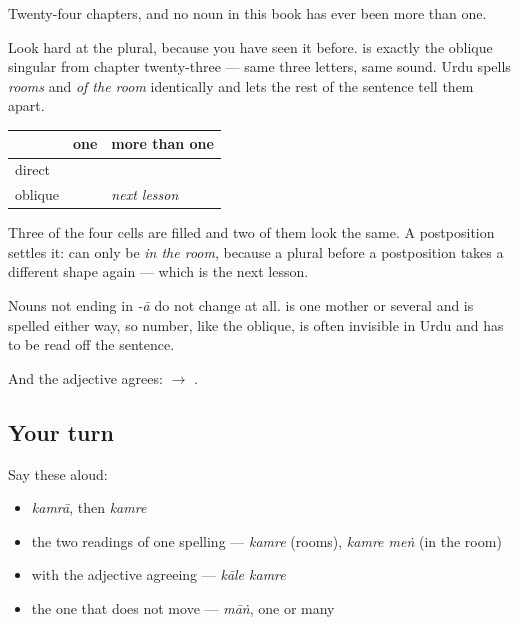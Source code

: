 Twenty-four chapters, and no noun in this book has ever been more than one.

Look hard at the plural, because you have seen it before. \textbf{} is exactly the oblique singular from chapter twenty-three — same three letters, same sound. Urdu spells \emph{rooms} and \emph{of the room} identically and lets the rest of the sentence tell them apart.

\begin{grammarlens}[title={Grammar Lens: the table, and what the postposition settles}]
\noindent
\begin{tabularx}{\linewidth}{@{}>{\raggedright\arraybackslash}X>{\raggedright\arraybackslash}X>{\raggedright\arraybackslash}X@{}}
\toprule
\textbf{} & \textbf{one} & \textbf{more than one} \\
\midrule
direct & \textbf{\ur{کمرہ}} & \textbf{\ur{کمرے}} \\
oblique & \textbf{\ur{کمرے}} & \emph{next lesson} \\
\bottomrule
\end{tabularx}

Three of the four cells are filled and two of them look the same. A postposition settles it: \textbf{ } can only be \emph{in the room}, because a plural before a postposition takes a different shape again — which is the next lesson.

Nouns not ending in \emph{-ā} do not change at all. \textbf{} is one mother or several and is spelled \textbf{} either way, so number, like the oblique, is often invisible in Urdu and has to be read off the sentence.

And the adjective agrees: \textbf{ } $\to$ \textbf{ }.
\end{grammarlens}

\subsection*{Your turn}
Say these aloud:

\begin{itemize}
\raggedright
  \item \emph{kamrā}, then \emph{kamre}
  \item the two readings of one spelling — \emph{kamre} (rooms), \emph{kamre meṅ} (in the room)
  \item with the adjective agreeing — \emph{kāle kamre}
  \item the one that does not move — \emph{māṅ}, one or many
\end{itemize}

